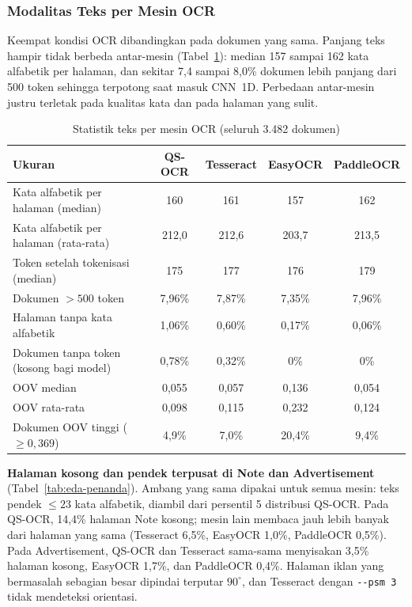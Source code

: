 \subsubsection{Modalitas Teks per Mesin OCR}

Keempat kondisi OCR dibandingkan pada dokumen yang sama. Panjang teks hampir tidak
berbeda antar-mesin (Tabel~\ref{tab:eda-panjang}): median 157 sampai 162 kata alfabetik
per halaman, dan sekitar 7,4 sampai 8,0\% dokumen lebih panjang dari 500 token sehingga
terpotong saat masuk CNN~1D. Perbedaan antar-mesin justru terletak pada kualitas kata dan
pada halaman yang sulit.

\begin{table}[H]
  \centering
  \caption{Statistik teks per mesin OCR (seluruh 3.482 dokumen)}
  \label{tab:eda-panjang}
  \fontsize{10}{12}\selectfont
  \begin{tabular}{|l|c|c|c|c|}
    \hline
    \textbf{Ukuran} & \textbf{QS-OCR} & \textbf{Tesseract} & \textbf{EasyOCR} &
    \textbf{PaddleOCR} \\ \hline
    Kata alfabetik per halaman (median) & 160 & 161 & 157 & 162 \\ \hline
    Kata alfabetik per halaman (rata-rata) & 212,0 & 212,6 & 203,7 & 213,5 \\ \hline
    Token setelah tokenisasi (median) & 175 & 177 & 176 & 179 \\ \hline
    Dokumen $> 500$ token & 7,96\% & 7,87\% & 7,35\% & 7,96\% \\ \hline
    Halaman tanpa kata alfabetik & 1,06\% & 0,60\% & 0,17\% & 0,06\% \\ \hline
    Dokumen tanpa token (kosong bagi model) & 0,78\% & 0,32\% & 0\% & 0\% \\ \hline
    OOV median & 0,055 & 0,057 & 0,136 & 0,054 \\ \hline
    OOV rata-rata & 0,098 & 0,115 & 0,232 & 0,124 \\ \hline
    Dokumen OOV tinggi ($\geq 0{,}369$) & 4,9\% & 7,0\% & 20,4\% & 9,4\% \\ \hline
  \end{tabular}
\end{table}

\textbf{Halaman kosong dan pendek terpusat di Note dan Advertisement}
(Tabel~\ref{tab:eda-penanda}). Ambang yang sama dipakai untuk semua mesin: teks pendek
$\leq 23$ kata alfabetik, diambil dari persentil 5 distribusi QS-OCR. Pada QS-OCR, 14,4\%
halaman Note kosong; mesin lain membaca jauh lebih banyak dari halaman yang sama (Tesseract
6,5\%, EasyOCR 1,0\%, PaddleOCR 0,5\%). Pada Advertisement, QS-OCR dan Tesseract
sama-sama menyisakan 3,5\% halaman kosong, EasyOCR 1,7\%, dan PaddleOCR 0,4\%. Halaman
iklan yang bermasalah sebagian besar dipindai terputar $90^\circ$, dan Tesseract dengan
\texttt{-{}-psm 3} tidak mendeteksi orientasi.

